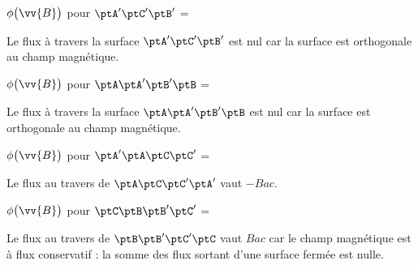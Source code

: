 



\begin{enonce}
$\phi \big(\vv{B} \big)$ pour $\ptA'\ptC'\ptB'$ =
\end{enonce}
%
\begin{corrige}
Le flux à travers la surface $\ptA'\ptC'\ptB'$ est nul car la surface est orthogonale au champ magnétique.
\end{corrige}





\begin{enonce}
$\phi \big(\vv{B} \big)$ pour $\ptA\ptA'\ptB'\ptB$ =
\end{enonce}
%
\begin{corrige}
Le flux à travers la surface $\ptA\ptA'\ptB'\ptB$ est nul car la surface est orthogonale au champ magnétique.
\end{corrige}




\begin{enonce}
$\phi \big(\vv{B} \big)$ pour $\ptA'\ptA\ptC\ptC'$ =
\end{enonce}
%
\begin{corrige}
Le flux au travers de $\ptA\ptC\ptC'\ptA'$ vaut $-Bac$.
\end{corrige}




\begin{enonce}
$\phi \big(\vv{B} \big)$ pour $\ptC\ptB\ptB'\ptC'$ =
\end{enonce}
%

\begin{corrige}
Le flux au travers de $\ptB\ptB'\ptC'\ptC$ vaut $Bac$ car le champ magnétique est à flux conservatif : la somme des flux sortant d'une surface fermée est nulle.
\end{corrige}

